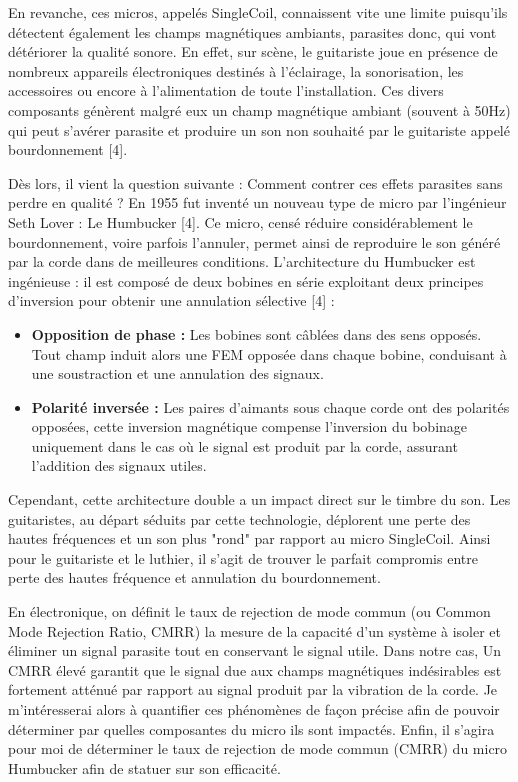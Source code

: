\documentclass[11pt, a4paper]{article}
\begin{document}
En revanche, ces micros, appelés SingleCoil, connaissent vite une limite puisqu'ils détectent également les champs magnétiques ambiants, parasites donc, qui vont détériorer la qualité sonore. En effet, sur scène, le guitariste joue en présence de nombreux appareils électroniques destinés à l'éclairage, la sonorisation, les accessoires ou encore à l'alimentation de toute l'installation. Ces divers composants génèrent malgré eux un champ magnétique ambiant (souvent à 50Hz) qui peut s'avérer parasite et produire un son non souhaité par le guitariste appelé bourdonnement [4].

Dès lors, il vient la question suivante : Comment contrer ces effets parasites sans perdre en qualité ? En 1955 fut inventé un nouveau type de micro par l'ingénieur Seth Lover : Le Humbucker [4]. Ce micro, censé réduire considérablement le bourdonnement, voire parfois l'annuler, permet ainsi de reproduire le son généré par la corde dans de meilleures conditions. L'architecture du Humbucker est ingénieuse : il est composé de deux bobines en série exploitant deux principes d'inversion pour obtenir une annulation sélective [4] :
\begin{itemize}
    \item \textbf{Opposition de phase :} Les bobines sont câblées dans des sens opposés. Tout champ induit alors une FEM opposée dans chaque bobine, conduisant à une soustraction et une annulation des signaux.
    \item \textbf{Polarité inversée :} Les paires d'aimants sous chaque corde ont des polarités opposées, cette inversion magnétique compense l'inversion du bobinage uniquement dans le cas où le signal est produit par la corde, assurant l'addition des signaux utiles.
\end{itemize}

Cependant, cette architecture double a un impact direct sur le timbre du son. Les guitaristes, au départ séduits par cette technologie, déplorent une perte des hautes fréquences et un son plus "rond" par rapport au micro SingleCoil. Ainsi pour le guitariste et le luthier, il s'agit de trouver le parfait compromis entre perte des hautes fréquence et annulation du bourdonnement.

En électronique, on définit le taux de rejection de mode commun (ou Common Mode Rejection Ratio, CMRR) la mesure de la capacité d'un système à isoler et éliminer un signal parasite tout en conservant le signal utile. Dans notre cas, Un CMRR élevé garantit que le signal due aux champs magnétiques indésirables est fortement atténué par rapport au signal produit par la vibration de la corde. Je m'intéresserai alors à quantifier ces phénomènes de façon précise afin de pouvoir déterminer par quelles composantes du micro ils sont impactés. Enfin, il s'agira pour moi de déterminer le taux de rejection de mode commun (CMRR) du micro Humbucker afin de statuer sur son efficacité.
\end{document}
